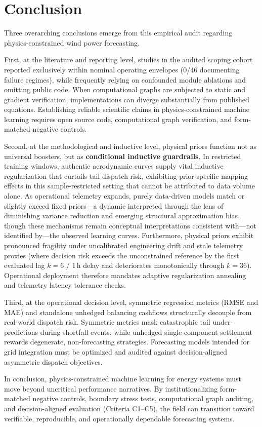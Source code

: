 \section{Conclusion}
\label{sec:conclusion}

Three overarching conclusions emerge from this empirical audit regarding physics-constrained wind power forecasting.

First, at the literature and reporting level, studies in the audited scoping cohort reported exclusively within nominal operating envelopes (0/46 documenting failure regimes), while frequently relying on confounded module ablations and omitting public code. When computational graphs are subjected to static and gradient verification, implementations can diverge substantially from published equations. Establishing reliable scientific claims in physics-constrained machine learning requires open source code, computational graph verification, and form-matched negative controls.

Second, at the methodological and inductive level, physical priors function not as universal boosters, but as \textbf{conditional inductive guardrails}. In restricted training windows, authentic aerodynamic curves supply vital inductive regularization that curtails tail dispatch risk, exhibiting prior-specific mapping effects in this sample-restricted setting that cannot be attributed to data volume alone. As operational telemetry expands, purely data-driven models match or slightly exceed fixed priors---a dynamic interpreted through the lens of diminishing variance reduction and emerging structural approximation bias, though these mechanisms remain conceptual interpretations consistent with---not identified by---the observed learning curves. Furthermore, physical priors exhibit pronounced fragility under uncalibrated engineering drift and stale telemetry proxies (where decision risk exceeds the unconstrained reference by the first evaluated lag $k=6$ / 1\,h delay and deteriorates monotonically through $k=36$). Operational deployment therefore mandates adaptive regularization annealing and telemetry latency tolerance checks.

Third, at the operational decision level, symmetric regression metrics (RMSE and MAE) and standalone unhedged balancing cashflows structurally decouple from real-world dispatch risk. Symmetric metrics mask catastrophic tail under-predictions during shortfall events, while unhedged single-component settlement rewards degenerate, non-forecasting strategies. Forecasting models intended for grid integration must be optimized and audited against decision-aligned asymmetric dispatch objectives.

In conclusion, physics-constrained machine learning for energy systems must move beyond uncritical performance narratives. By institutionalizing form-matched negative controls, boundary stress tests, computational graph auditing, and decision-aligned evaluation (Criteria C1--C5), the field can transition toward verifiable, reproducible, and operationally dependable forecasting systems.
